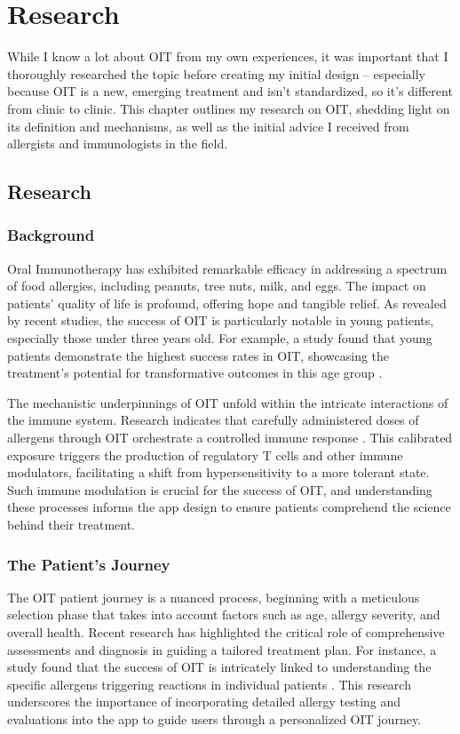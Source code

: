 \chapter{Research}

While I know a lot about OIT from my own experiences, it was important that I thoroughly researched the topic before creating my initial design – especially because OIT is a new, emerging treatment and isn't standardized, so it's different from clinic to clinic. This chapter outlines my research on OIT, shedding light on its definition and mechanisms, as well as the initial advice I received from allergists and immunologists in the field.

\section{Research}

\subsection{Background}
Oral Immunotherapy has exhibited remarkable efficacy in addressing a spectrum of food allergies, including peanuts, tree nuts, milk, and eggs. The impact on patients' quality of life is profound, offering hope and tangible relief. As revealed by recent studies, the success of OIT is particularly notable in young patients, especially those under three years old. For example, a study found that young patients demonstrate the highest success rates in OIT, showcasing the treatment's potential for transformative outcomes in this age group \cite{Blumchen}.

The mechanistic underpinnings of OIT unfold within the intricate interactions of the immune system. Research indicates that carefully administered doses of allergens through OIT orchestrate a controlled immune response \cite{Nairn}. This calibrated exposure triggers the production of regulatory T cells and other immune modulators, facilitating a shift from hypersensitivity to a more tolerant state. Such immune modulation is crucial for the success of OIT, and understanding these processes informs the app design to ensure patients comprehend the science behind their treatment. 

\subsection{The Patient's Journey}

The OIT patient journey is a nuanced process, beginning with a meticulous selection phase that takes into account factors such as age, allergy severity, and overall health. Recent research has highlighted the critical role of comprehensive assessments and diagnosis in guiding a tailored treatment plan. For instance, a study found that the success of OIT is intricately linked to understanding the specific allergens triggering reactions in individual patients \cite{Dominguez}. This research underscores the importance of incorporating detailed allergy testing and evaluations into the app to guide users through a personalized OIT journey.

